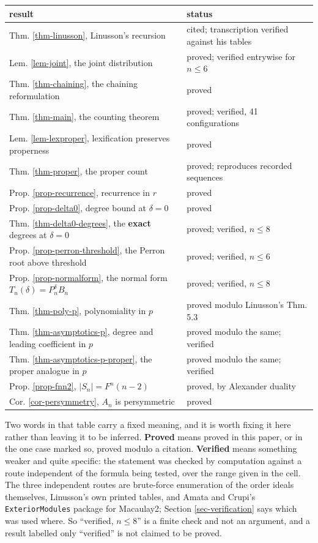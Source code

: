 \documentclass[11pt, a4paper, abstract=yes]{scrartcl}
\theoremstyle{definition}
\theoremstyle{remark}
\theoremstyle{plain}
\begin{document}
\begin{center}
\small
\begin{tabular}{ll}
result & status\\
\hline
Thm. \ref{thm-linusson}, Linusson's recursion & cited; transcription verified against his tables\\
Lem. \ref{lem-joint}, the joint distribution & proved; verified entrywise for \(n\le6\)\\
Thm. \ref{thm-chaining}, the chaining reformulation & proved\\
Thm. \ref{thm-main}, the counting theorem & proved; verified, 41 configurations\\
Lem. \ref{lem-lexproper}, lexification preserves properness & proved\\
Thm. \ref{thm-proper}, the proper count & proved; reproduces recorded sequences\\
Prop. \ref{prop-recurrence}, recurrence in \(r\) & proved\\
Prop. \ref{prop-delta0}, degree bound at \(\delta=0\) & proved\\
Thm. \ref{thm-delta0-degrees}, the \textbf{exact} degrees at \(\delta=0\) & proved; verified, \(n\le8\)\\
Prop. \ref{prop-perron-threshold}, the Perron root above threshold & proved; verified, \(n\le6\)\\
Prop. \ref{prop-normalform}, the normal form \(T_n(\delta)=P_n^{\delta}B_n\) & proved; verified, \(n\le8\)\\
Thm. \ref{thm-poly-p}, polynomiality in \(p\) & proved modulo Linusson's Thm. 5.3\\
Thm. \ref{thm-asymptotics-p}, degree and leading coefficient in \(p\) & proved modulo the same; verified\\
Thm. \ref{thm-asymptotics-p-proper}, the proper analogue in \(p\) & proved modulo the same; verified\\
Prop. \ref{prop-fnn2}, \(\lvert S_n\rvert=F^n(n-2)\) & proved, by Alexander duality\\
Cor. \ref{cor-persymmetry}, \(A_n\) is persymmetric & proved\\
\end{tabular}
\end{center}

Two words in that table carry a fixed meaning, and it is worth fixing it here rather than leaving it
to be inferred. \textbf{Proved} means proved in this paper, or in the one case marked so, proved modulo a
citation. \textbf{Verified} means something weaker and quite specific: the statement was checked by
computation against a route independent of the formula being tested, over the range given in the
cell. The three independent routes are brute-force enumeration of the order ideals themselves,
Linusson's own printed tables, and Amata and Crupi's \texttt{ExteriorModules} package for Macaulay2; Section
\ref{sec-verification} says which was used where. So ``verified, \(n\le8\)'' is a finite check and not
an argument, and a result labelled only ``verified'' is not claimed to be proved.
\end{document}
